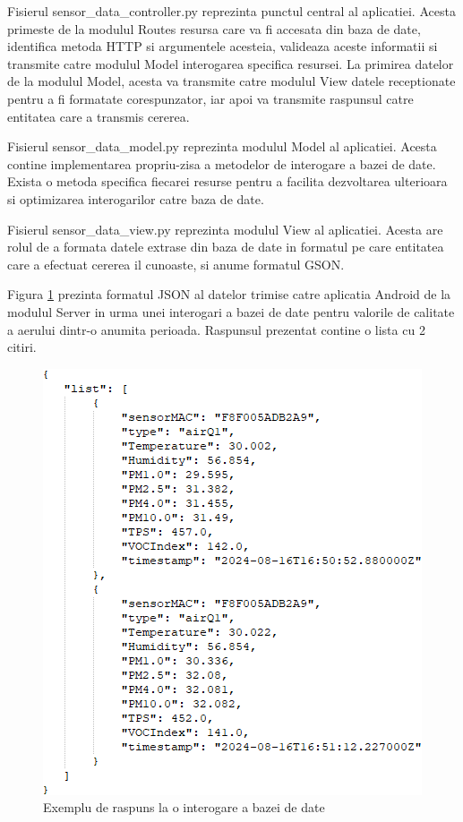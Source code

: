 Fisierul sensor\_data\_controller.py reprezinta punctul central al aplicatiei. Acesta primeste de la modulul Routes resursa care va fi accesata din baza de date, 
identifica metoda HTTP si argumentele acesteia, valideaza aceste informatii si transmite catre modulul Model interogarea specifica resursei. La primirea datelor de la 
modulul Model, acesta va transmite catre modulul View datele receptionate pentru a fi formatate corespunzator, iar apoi va transmite raspunsul catre entitatea care a transmis 
cererea.

Fisierul sensor\_data\_model.py reprezinta modulul Model al aplicatiei. Acesta contine implementarea propriu-zisa a metodelor de interogare a bazei de date. Exista o metoda 
specifica fiecarei resurse pentru a facilita dezvoltarea ulterioara si optimizarea interogarilor catre baza de date.

Fisierul sensor\_data\_view.py reprezinta modulul View al aplicatiei. Acesta are rolul de a formata datele extrase din baza de date in formatul pe care entitatea care a 
efectuat cererea il cunoaste, si anume formatul GSON. 

Figura \ref{fig:Server2AndroidDataFormat} prezinta formatul JSON al datelor trimise catre aplicatia Android de la modulul Server in urma unei interogari a bazei de 
date pentru valorile de calitate a aerului dintr-o anumita perioada. Raspunsul prezentat contine o lista cu 2 citiri.
\begin{figure}[H]
    \centering
    \includegraphics[scale=0.7]{figs/Server2AndroidDataFormat.png}
    \caption{Exemplu de raspuns la o interogare a bazei de date}
    \label{fig:Server2AndroidDataFormat}
\end{figure}


